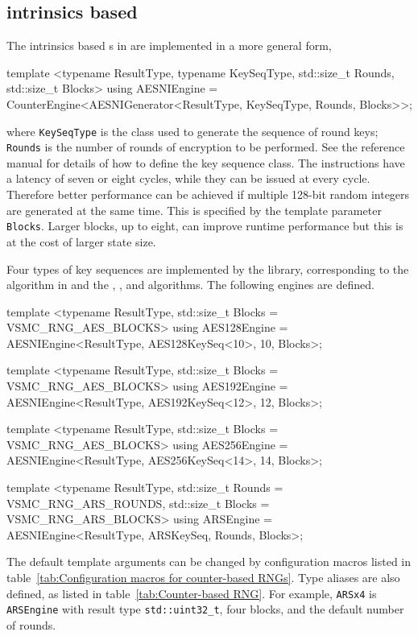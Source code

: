 \subsection{\protect\aesni intrinsics based \protect\rng}
\label{sub:AES-NI intrinsics based RNG}

The \aesni intrinsics based \rng{}s in \textcite{Salmon:2011um} are implemented
in a more general form,
\begin{cppcode}
  template <typename ResultType, typename KeySeqType, std::size_t Rounds,
      std::size_t Blocks>
  using AESNIEngine =
      CounterEngine<AESNIGenerator<ResultType, KeySeqType, Rounds, Blocks>>;
\end{cppcode}
where \verb|KeySeqType| is the class used to generate the sequence of round
keys; \verb|Rounds| is the number of rounds of \aes encryption to be performed.
See the reference manual for details of how to define the key sequence class.
The \aesni instructions have a latency of seven or eight cycles, while they can
be issued at every cycle. Therefore better performance can be achieved if
multiple 128-bit random integers are generated at the same time. This is
specified by the template parameter \verb|Blocks|. Larger blocks, up to eight,
can improve runtime performance but this is at the cost of larger state size.

Four types of key sequences are implemented by the library, corresponding to
the \ars algorithm in \textcite{Salmon:2011um} and the , , and
 algorithms. The following \rng engines are defined.
\begin{cppcode}
  template <typename ResultType, std::size_t Blocks = VSMC_RNG_AES_BLOCKS>
  using AES128Engine = AESNIEngine<ResultType, AES128KeySeq<10>, 10, Blocks>;

  template <typename ResultType, std::size_t Blocks = VSMC_RNG_AES_BLOCKS>
  using AES192Engine = AESNIEngine<ResultType, AES192KeySeq<12>, 12, Blocks>;

  template <typename ResultType, std::size_t Blocks = VSMC_RNG_AES_BLOCKS>
  using AES256Engine = AESNIEngine<ResultType, AES256KeySeq<14>, 14, Blocks>;

  template <typename ResultType, std::size_t Rounds = VSMC_RNG_ARS_ROUNDS,
      std::size_t Blocks = VSMC_RNG_ARS_BLOCKS>
  using ARSEngine = AESNIEngine<ResultType, ARSKeySeq, Rounds, Blocks>;
\end{cppcode}
The default template arguments can be changed by configuration macros listed in
table~\ref{tab:Configuration macros for counter-based RNGs}. Type aliases are
also defined, as listed in table~\ref{tab:Counter-based RNG}. For example,
\verb|ARSx4| is \verb|ARSEngine| with result type \verb|std::uint32_t|, four
blocks, and the default number of rounds.

